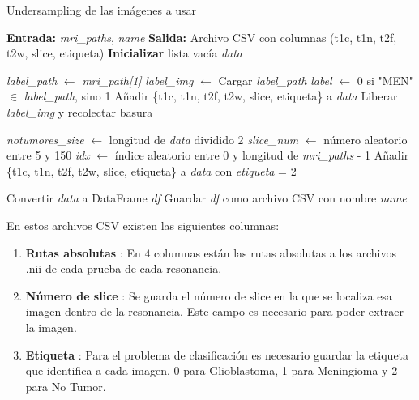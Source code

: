 \begin{algorithm}
	\caption{Undersampling de las imágenes a usar}
	\begin{algorithmic}[1]
		\STATE \textbf{Entrada:} \textit{mri\_paths}, \textit{name}
		\STATE \textbf{Salida:} Archivo CSV con columnas (t1c, t1n, t2f, t2w, slice, etiqueta)
		\STATE \textbf{Inicializar} lista vacía \textit{data}
		
		\STATE \textit{label\_path} $\gets$ \textit{mri\_path[1]}
		\STATE \textit{label\_img} $\gets$ Cargar \textit{label\_path}
		\STATE \textit{label} $\gets$ 0 si "MEN" $\in$ \textit{label\_path}, sino 1
		\STATE Añadir \{t1c, t1n, t2f, t2w, slice, etiqueta\} a \textit{data}
		\ENDIF
		\ENDFOR
		\STATE Liberar \textit{label\_img} y recolectar basura
		\ENDFOR
		
		\STATE \textit{notumores\_size} $\gets$ longitud de \textit{data} dividido 2
		\STATE \textit{slice\_num} $\gets$ número aleatorio entre 5 y 150
		\STATE \textit{idx} $\gets$ índice aleatorio entre 0 y longitud de \textit{mri\_paths} - 1
		\STATE Añadir \{t1c, t1n, t2f, t2w, slice, etiqueta\} a \textit{data} con \textit{etiqueta} = 2
		\ENDIF
		\ENDFOR
		
		\STATE Convertir \textit{data} a DataFrame \textit{df}
		\STATE Guardar \textit{df} como archivo CSV con nombre \textit{name}
		
	\end{algorithmic}
\end{algorithm}


En estos archivos CSV existen las siguientes columnas:

\begin{enumerate}
	\item \textbf{Rutas absolutas} : En $4$ columnas están las rutas absolutas a los archivos .nii de cada prueba de cada resonancia.
	\item \textbf{Número de slice} : Se guarda el número de slice en la que se localiza esa imagen dentro de la resonancia. Este campo es necesario para poder extraer la imagen.
	\item \textbf{Etiqueta} : Para el problema de clasificación es necesario guardar la etiqueta que identifica a cada imagen, 0 para Glioblastoma, 1 para Meningioma y 2 para No Tumor.
\end{enumerate}


